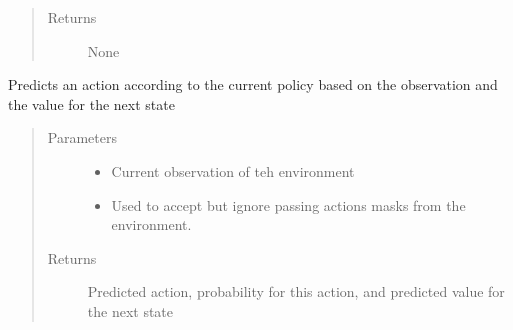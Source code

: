 \documentclass[letterpaper,10pt,english]{sphinxmanual}
\begin{document}
\begin{fulllineitems}
\begin{fulllineitems}
\begin{quote}
\begin{description}
\item[{Returns}] \leavevmode
\sphinxAtStartPar
None

\end{description}\end{quote}

\end{fulllineitems}


\begin{fulllineitems}
\label{\detokenize{agents.reinforcement_learning:agents.reinforcement_learning.ppo.PPO.forward}}
\sphinxAtStartPar
Predicts an action according to the current policy based on the observation
and the value for the next state
\begin{quote}\begin{description}
\item[{Parameters}] \leavevmode\begin{itemize}
\item {} 
\sphinxAtStartPar
{} \textendash{} Current observation of teh environment

\item {} 
\sphinxAtStartPar
{} \textendash{} Used to accept but ignore passing actions masks from the environment.

\end{itemize}

\item[{Returns}] \leavevmode
\sphinxAtStartPar
Predicted action, probability for this action, and predicted value for the next state

\end{description}\end{quote}

\end{fulllineitems}


\begin{fulllineitems}
\label{\detokenize{agents.reinforcement_learning:agents.reinforcement_learning.ppo.PPO.predict}}\begin{quote}


\end{quote}
\end{fulllineitems}
\end{fulllineitems}
\end{document}
